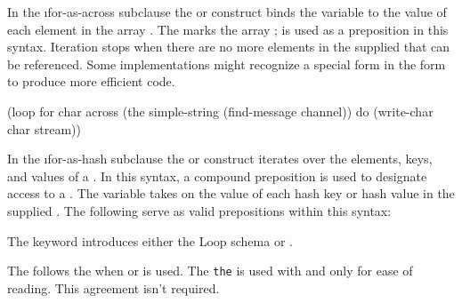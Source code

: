 \endsubsubsubsubsection%

\endsubsubsubsection%


  In the \i{for-as-across} subclause the  
  or  construct binds the variable  to the value of
  each element in the array .
  The   marks the array ; 
  is used as a preposition in this syntax.
  Iteration stops when there are no more elements in the supplied
   that can be referenced.
  Some implementations might recognize a  special form
  in the  form to produce more efficient code.
 

\code
 (loop for char across (the simple-string (find-message channel))
       do (write-char char stream))
\endcode
 
\endsubsubsubsubsection%

\endsubsubsubsection%


  In the \i{for-as-hash} subclause
  the  
  or  construct 
  iterates over the elements, keys, and values of a .
  In this syntax, a compound preposition is used to designate access to a
  .
  The variable  takes on the value of each hash key
  or hash value in the supplied . 
  The following  serve as valid prepositions within this syntax:
 
\beginlist
 
             
The keyword  introduces either the Loop schema 
 or .
 
 
The  
follows the   when  or
 is used.  The  {\tt the} is used with
 and  only for ease of reading.
This agreement isn't required.
 
